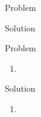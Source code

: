 \documentclass{article}
\begin{document}
\begin{problem}{}{}
    Problem
\end{problem}
\begin{solution}{}{}
    Solution
\end{solution}

\begin{problem}{}{}
    Problem
    \begin{enumerate}[label=\textbf{\alph*}.]
        \item
    \end{enumerate}
\end{problem}
\begin{solution}{}{}
    Solution
    \begin{enumerate}[label=\textbf{\alph*}.]
        \item
    \end{enumerate}
\end{solution}
\end{document}
